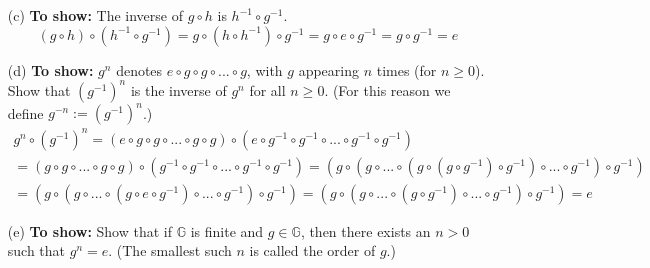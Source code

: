 \begin{itemize}
	\item [(c)]
	\textbf{To show:} The inverse of \(g \circ h\) is \(h^{-1} \circ g^{-1}\).
	\begin{equation*}
		(g \circ h) \circ (h^{-1} \circ g^{-1}) = g \circ (h \circ h^{-1}) \circ g^{-1} = g \circ e \circ g^{-1} = g  \circ g^{-1} = e			
	\end{equation*}
	\item [(d)]
	\textbf{To show:} \(g^n\) denotes \(e \circ g \circ g \circ ... \circ g\), with \(g\) appearing \(n\) times (for \(n \ge 0\)). Show that \((g^{-1})^n\) is the inverse of \(g^n\) for all \(n \ge 0\). (For this reason we define \(g^{-n} := (g^{-1})^n\).)
	\begin{equation*}
		\begin{array}{l}
		g^n \circ (g^{-1})^n = (e \circ g \circ g \circ ... \circ g \circ g) \circ (e \circ g^{-1} \circ g^{-1} \circ ... \circ g^{-1} \circ g^{-1}) \\
		= (g \circ g \circ ... \circ g \circ g) \circ (g^{-1} \circ g^{-1} \circ ... \circ g^{-1} \circ g^{-1})
		= (g \circ (g \circ ... \circ  (g\circ (g \circ g^{-1}) \circ g^{-1}) \circ ... \circ g^{-1})\circ g^{-1})\\
		= (g \circ (g \circ ... \circ  (g\circ e \circ g^{-1}) \circ ... \circ g^{-1})\circ g^{-1})
		= (g \circ (g \circ ... \circ  (g \circ g^{-1}) \circ ... \circ g^{-1})\circ g^{-1})
		= e
		\end{array}		
	\end{equation*}

	\item [(e)]
	\textbf{To show:} Show that if \(\mathds{G}\) is finite and \(g \in \mathds{G}\), then there exists an \(n > 0\) such that \(g^n = e\). (The smallest such \(n\) is called the order of \(g\).)
\end{itemize} 